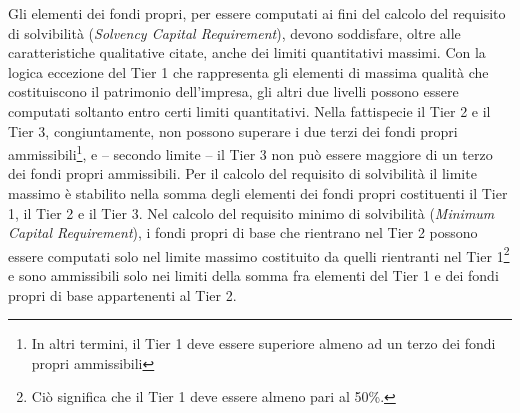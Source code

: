 Gli elementi dei fondi propri, per essere computati ai fini del calcolo del requisito di solvibilità ({\itshape Solvency Capital Requirement}), devono soddisfare, oltre alle caratteristiche qualitative citate, anche dei limiti quantitativi massimi. 
Con la logica eccezione del Tier 1 che rappresenta gli elementi di massima qualità che costituiscono il patrimonio dell’impresa, gli altri due livelli possono essere computati soltanto entro certi limiti quantitativi. Nella fattispecie il Tier 2 e il Tier 3, congiuntamente, non possono superare i due terzi dei fondi propri ammissibili\footnote{In altri termini, il Tier 1 deve essere superiore almeno ad un terzo dei fondi propri ammissibili}, e – secondo limite – il Tier 3 non può essere maggiore di un terzo dei fondi propri ammissibili. Per il calcolo del requisito di solvibilità il limite massimo è stabilito nella somma degli elementi dei fondi propri costituenti il Tier 1, il Tier 2 e il Tier 3.
Nel calcolo del requisito minimo di solvibilità ({\itshape Minimum Capital Requirement}), i fondi propri di base che rientrano nel Tier 2 possono essere computati solo nel limite massimo costituito da quelli rientranti nel Tier 1\footnote{Ciò significa che il Tier 1 deve essere almeno pari al 50\%.} e sono ammissibili solo nei limiti della somma fra elementi del Tier 1 e dei fondi propri di base appartenenti al Tier 2.

